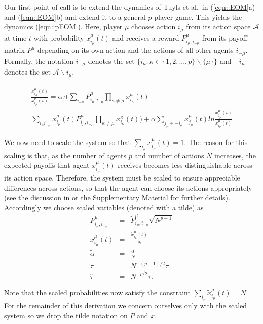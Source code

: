 \documentclass[sigconf]{aamas}
\newcommand{\xmu}[2]{x_{#1_#2}^{#2}(t)}
\newcommand{\payoff}[2]{P^{#2}_{#1_#2, #1_{-#2}}}
\newcommand{\txmu}[2]{\tilde{x}_{#1_#2}^{#2}(t)}
\newcommand{\tpayoff}[2]{\tilde{P}^{#2}_{#1_#2, #1_{-#2}}}
\newcommand{\talpha}{\tilde{\alpha}}
\newcommand{\ttau}{\tilde{\tau}}
\newcommand{\htau}{\hat{\tau}}
\begin{document}
Our first point of call is to extend the dynamics of Tuyls et al.~in  (\ref{eqn::EOM}a) and (\ref{eqn::EOM}b) \st{and extend it} to a general $p$-player game. This yields the dynamics (\ref{eqn::pEOM}). Here, player $\mu$ chooses action $i_{\mu}$ from its action space $\mathcal{A}$ at time $t$ with probability $\xmu{i}{\mu}$ and receives a reward $\payoff{i}{\mu}$ from its payoff matrix $P^\mu$ depending on its own action and the actions of all other agents $i_{-\mu}$. Formally, the notation $i_{-\mu}$ denotes the set $\{ i_\kappa : \kappa \in \{1, 2, ..., p\} \backslash \{\mu\} \}$ and $-i_{\mu}$ denotes the set $\mathcal{A} \backslash {i_\mu}$.

\begin{equation}
\begin{split}
    \label{eqn::pEOM}
    \frac{\dot{\xmu{i}{\mu}}}{\xmu{i}{\mu}} = \alpha \tau ( \sum_{i_{-\mu}} \payoff{i}{\mu} \prod_{\kappa \neq \mu} \xmu{i}{\kappa} - \\ \sum_{i_\mu i_{-\mu}} \xmu{i}{\mu} \payoff{i}{\mu} \prod_{\kappa \neq \mu} \xmu{i}{\kappa} ) + \alpha \sum_{j_\mu \in -i_\mu} \xmu{j}{\mu} ln \frac{\xmu{j}{\mu}}{\xmu{i}{\mu}}
\end{split}
\end{equation}

We now need to scale the system so that $\sum_{i_\mu} \xmu{i}{\mu} = 1$. The reason for this scaling is that, as the number of agents $p$ and number of actions $N$ increases, the expected payoffs that agent $\xmu{i}{\mu}$ receives becomes less distinguishable across its action space. Therefore, the system must be scaled to ensure appreciable differences across actions, so that the agent can choose its actions appropriately (see the discussion in \cite{Sanders2018} or the Supplementary Material for further details). Accordingly we choose scaled variables (denoted with a tilde) as
%
\begin{eqnarray*}
        \payoff{i}{\mu} & = & \tpayoff{i}{\mu} \sqrt{N^{p-1}}\\
        \xmu{i}{\mu} & = & \frac{\txmu{i}{\mu}}{N} \\
        \talpha & = & \frac{\alpha}{N} \\
        \ttau & = & N^{-(p-1)/2} \tau \\
        \htau & = & N^{-p/2} \tau.
\end{eqnarray*}

Note that the scaled probabilities now satisfy the constraint $\sum_{i_\mu} \txmu{i}{\mu} = N$. For the remainder of this derivation we concern ourselves only with the scaled system so we drop the tilde notation on $P$ and $x$. 
\end{document}
